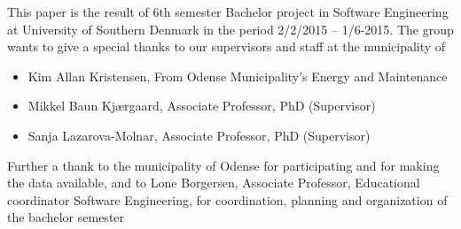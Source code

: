 This paper is the result of 6th semester Bachelor project in Software Engineering at University of Southern Denmark in the period 2/2/2015 – 1/6-2015.
\newline
\newline
The group wants to give a special thanks to our supervisors and staff at the municipality of 
\begin{itemize}
  \item Kim Allan Kristensen, From Odense Municipality’s Energy and Maintenance
  \item Mikkel Baun Kjærgaard,     Associate Professor, PhD     (Supervisor)
  \item  Sanja Lazarova-Molnar,     Associate Professor, PhD      (Supervisor)
\end{itemize}
Further a thank to the municipality of Odense for participating and for making the data available, and to Lone Borgersen, Associate Professor, Educational coordinator Software Engineering, for coordination, planning and organization of the bachelor semester